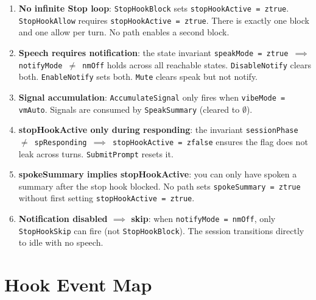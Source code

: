 \documentclass[a4paper,10pt,fleqn]{article}
\begin{document}
\begin{enumerate}
  \item \textbf{No infinite Stop loop}: \texttt{StopHookBlock} sets
    \texttt{stopHookActive = ztrue}. \texttt{StopHookAllow} requires
    \texttt{stopHookActive = ztrue}. There is exactly one block and
    one allow per turn. No path enables a second block.

  \item \textbf{Speech requires notification}: the state invariant
    \texttt{speakMode = ztrue $\implies$ notifyMode $\neq$ nmOff}
    holds across all reachable states. \texttt{DisableNotify} clears
    both. \texttt{EnableNotify} sets both. \texttt{Mute} clears speak
    but not notify.

  \item \textbf{Signal accumulation}: \texttt{AccumulateSignal} only
    fires when \texttt{vibeMode = vmAuto}. Signals are consumed by
    \texttt{SpeakSummary} (cleared to $\emptyset$).

  \item \textbf{stopHookActive only during responding}: the invariant
    \texttt{sessionPhase $\neq$ spResponding $\implies$
    stopHookActive = zfalse} ensures the flag does not leak across
    turns. \texttt{SubmitPrompt} resets it.

  \item \textbf{spokeSummary implies stopHookActive}: you can only
    have spoken a summary after the stop hook blocked. No path sets
    \texttt{spokeSummary = ztrue} without first setting
    \texttt{stopHookActive = ztrue}.

  \item \textbf{Notification disabled $\implies$ skip}: when
    \texttt{notifyMode = nmOff}, only \texttt{StopHookSkip} can fire
    (not \texttt{StopHookBlock}). The session transitions directly
    to idle with no speech.
\end{enumerate}

\section{Hook Event Map}
\end{document}
